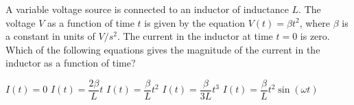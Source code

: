 \begin{questions}\setcounter{question}{31}\question
A variable voltage source is connected to an inductor of inductance $L$. The voltage $V$ as a function of time $t$ is given by the equation $V(t)=\beta t^{2}$, where $\beta$ is a constant in units of $\unit{V/s^2}$. The current in the inductor at time $t=0$ is zero. Which of the following equations gives the magnitude of the current in the inductor as a function of time?

\begin{choices}
\choice $I(t)=0$
\choice $I(t)=\dfrac{2 \beta}{L} t$
\choice $I(t)=\dfrac{\beta}{L} t^{2}$
\choice $I(t)=\dfrac{\beta}{3 L} t^{3}$
\choice $I(t)=\dfrac{\beta}{L} t^{2} \sin (\omega t)$
\end{choices}\end{questions}
